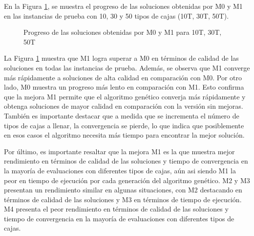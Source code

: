 En la Figura \ref{fig:progreso}, se muestra el progreso de las soluciones obtenidas por M0 y M1 en las instancias de prueba con 10, 30 y 50 tipos de cajas (10T, 30T, 50T).

\begin{figure}[H]
    \centering
    
    \caption{Progreso de las soluciones obtenidas por M0 y M1 para 10T, 30T, 50T}
    \label{fig:progreso}
\end{figure}

La Figura \ref{fig:progreso} muestra que M1 logra superar a M0 en términos de calidad de las soluciones en todas las instancias de prueba. Además, se observa que M1 converge más rápidamente a soluciones de alta calidad en comparación con M0. Por otro lado, M0 muestra un progreso más lento en comparación con M1. Esto confirma que la mejora M1 permite que el algoritmo genético converja más rápidamente y obtenga soluciones de mayor calidad en comparación con la versión sin mejoras. También es importante destacar que a medida que se incrementa el número de tipos de cajas a llenar, la convergencia se pierde, lo que indica que posiblemente en esos casos el algoritmo necesita más tiempo para encontrar la mejor solución.

Por último, es importante resaltar que la mejora M1 es la que muestra mejor rendimiento en términos de calidad de las soluciones y tiempo de convergencia en la mayoría de evaluaciones con diferentes tipos de cajas, aún asi siendo M1 la peor en tiempo de ejecución por cada generación del algoritmo genético. M2 y M3 presentan un rendimiento similar en algunas situaciones, con M2 destacando en términos de calidad de las soluciones y M3 en términos de tiempo de ejecución. M4 presenta el peor rendimiento en términos de calidad de las soluciones y tiempo de convergencia en la mayoría de evaluaciones con diferentes tipos de cajas.

